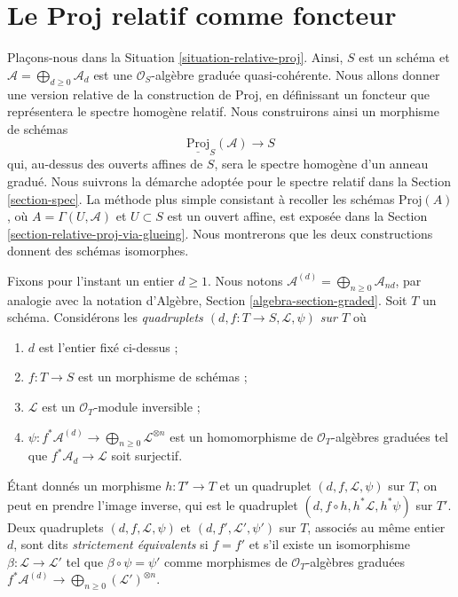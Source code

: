 \section{Le Proj relatif comme foncteur}
\label{section-relative-proj}

\noindent
Plaçons-nous dans la Situation \ref{situation-relative-proj}.
Ainsi, $S$ est un schéma et
$\mathcal{A} = \bigoplus_{d \geq 0} \mathcal{A}_d$ est une
$\mathcal{O}_S$-algèbre graduée quasi-cohérente. Nous allons donner une
version relative de la construction de $\text{Proj}$, en définissant un
foncteur que représentera le spectre homogène relatif. Nous construirons
ainsi un morphisme de schémas
$$
\underline{\text{Proj}}_S(\mathcal{A}) \longrightarrow S
$$
qui, au-dessus des ouverts affines de $S$, sera le spectre homogène d'un
anneau gradué. Nous suivrons la démarche adoptée pour le spectre relatif
dans la Section \ref{section-spec}. La méthode plus simple consistant à
recoller les schémas $\text{Proj}(A)$, où $A = \Gamma(U, \mathcal{A})$ et
$U \subset S$ est un ouvert affine, est exposée dans la
Section \ref{section-relative-proj-via-glueing}. Nous montrerons que les
deux constructions donnent des schémas isomorphes.

\medskip\noindent
Fixons pour l'instant un entier $d \geq 1$. Nous notons
$\mathcal{A}^{(d)} = \bigoplus_{n \geq 0} \mathcal{A}_{nd}$, par analogie
avec la notation d'Algèbre, Section \ref{algebra-section-graded}.
Soit $T$ un schéma. Considérons les {\it quadruplets
$(d, f : T \to S, \mathcal{L}, \psi)$ sur $T$} où
\begin{enumerate}
\item $d$ est l'entier fixé ci-dessus ;
\item $f : T \to S$ est un morphisme de schémas ;
\item $\mathcal{L}$ est un $\mathcal{O}_T$-module inversible ;
\item
$\psi : f^*\mathcal{A}^{(d)} \to \bigoplus_{n \geq 0}\mathcal{L}^{\otimes n}$
est un homomorphisme de $\mathcal{O}_T$-algèbres graduées tel que
$f^*\mathcal{A}_d \to \mathcal{L}$ soit surjectif.
\end{enumerate}
Étant donnés un morphisme $h : T' \to T$ et un quadruplet
$(d, f, \mathcal{L}, \psi)$ sur $T$, on peut en prendre l'image inverse,
qui est le quadruplet $(d, f \circ h, h^*\mathcal{L}, h^*\psi)$ sur $T'$.
Deux quadruplets $(d, f, \mathcal{L}, \psi)$ et
$(d, f', \mathcal{L}', \psi')$ sur $T$, associés au même entier $d$, sont
dits {\it strictement équivalents} si $f = f'$ et s'il existe un isomorphisme
$\beta : \mathcal{L} \to \mathcal{L}'$ tel que $\beta \circ \psi = \psi'$
comme morphismes de $\mathcal{O}_T$-algèbres graduées
$f^*\mathcal{A}^{(d)} \to \bigoplus_{n \geq 0} (\mathcal{L}')^{\otimes n}$.


